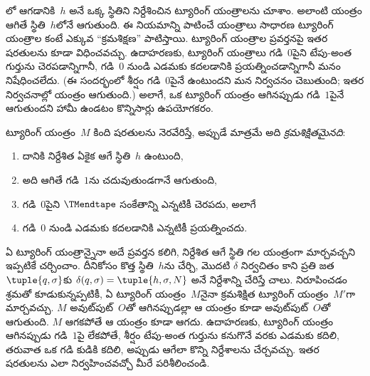 \documentclass[../../../include/open-logic-section]{subfiles}
\begin{document}

\begin{explain}
లో ఆగడానికి~$h$ అనే ఒక్క స్థితిని నిర్దేశించిన ట్యూరింగ్
యంత్రాలను చూశాం. అలాంటి యంత్రం ఆగితే స్థితి~$h$లోనే ఆగుతుంది.
ఈ నియమాన్ని పాటించే యంత్రాలు సాధారణ ట్యూరింగ్ యంత్రాల కంటే ఎక్కువ
``క్రమశిక్షణ'' పాటిస్తాయి. ట్యూరింగ్ యంత్రాల ప్రవర్తనపై
ఇతర షరతులను కూడా విధించవచ్చు. ఉదాహరణకు, ట్యూరింగ్ యంత్రాలు గడి~$0$పైని
టేపు-అంత గుర్తును చెరపడాన్నిగానీ, గడి~$0$ నుండి ఎడమకు కదలడానికి
ప్రయత్నించడాన్నిగానీ మనం నిషేధించలేదు. (ఈ సందర్భంలో శీర్షం గడి~$0$పైనే
ఉంటుందని మన నిర్వచనం చెబుతుంది; ఇతర నిర్వచనాల్లో యంత్రం ఆగుతుంది.) అలాగే,
ఒక ట్యూరింగ్ యంత్రం ఆగినప్పుడు గడి~$1$పైనే ఆగుతుందని హామీ ఉండటం కొన్నిసార్లు
ఉపయోగకరం.
\end{explain}

\begin{defn}
ట్యూరింగ్ యంత్రం~$M$ కింది షరతులను నెరవేరిస్తే, అప్పుడే మాత్రమే అది
\emph{క్రమశిక్షితమైనది}:
\begin{enumerate}
    \item దానికి నిర్దేశిత ఏకైక ఆగే స్థితి~$h$ ఉంటుంది,
    \item అది ఆగితే గడి~$1$ను చదువుతుండగానే ఆగుతుంది,
    \item గడి~$0$పైని $\TMendtape$ సంకేతాన్ని ఎన్నటికీ చెరపదు, అలాగే
    \item గడి~$0$ నుండి ఎడమకు కదలడానికి ఎన్నటికీ ప్రయత్నించదు.
\end{enumerate}
\end{defn}

\begin{explain}
ఏ ట్యూరింగ్ యంత్రాన్నైనా అదే ప్రవర్తన కలిగి, నిర్దేశిత ఆగే స్థితి గల యంత్రంగా
మార్చవచ్చని ఇప్పటికే చర్చించాం. దీనికోసం కొత్త స్థితి~$h$ను చేర్చి, మొదటి
$\delta$ నిర్వచితం కాని ప్రతి జత $\tuple{q,\sigma}$కు
$\delta(q, \sigma) = \tuple{h, \sigma, N}$ అనే నిర్దేశాన్ని చేరిస్తే చాలు.
నిరూపించడం శ్రమతో కూడుకున్నప్పటికీ, ఏ ట్యూరింగ్ యంత్రం~$M$నైనా
క్రమశిక్షిత ట్యూరింగ్ యంత్రం~$M'$గా మార్చవచ్చు. $M$ అవుట్‌పుట్~$O$తో
ఆగినప్పుడల్లా ఆ యంత్రం కూడా అవుట్‌పుట్~$O$తో ఆగుతుంది. $M$ ఆగకపోతే
ఆ యంత్రం కూడా ఆగదు. ఉదాహరణకు, ట్యూరింగ్ యంత్రం ఆగినప్పుడు గడి~$1$పై లేకపోతే,
శీర్షం టేపు-అంత గుర్తును కనుగొనే వరకు ఎడమకు కదిలి, తరువాత ఒక గడి కుడికి కదిలి,
అప్పుడు ఆగేలా కొన్ని నిర్దేశాలను చేర్చవచ్చు. ఇతర షరతులను ఎలా నిర్వహించవచ్చో
మీరే పరిశీలించండి.
\end{explain}
\end{document}
